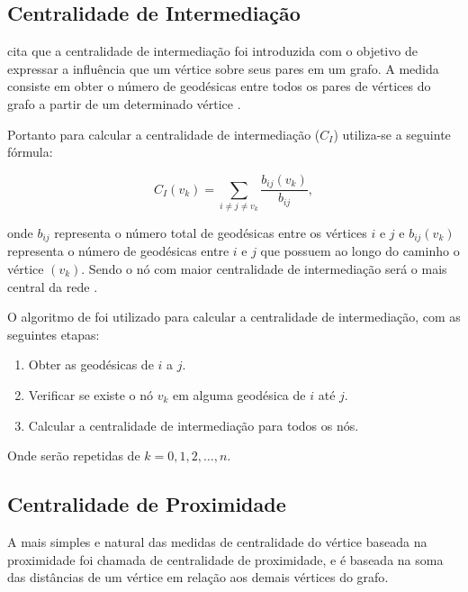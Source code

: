 \documentclass[12pt]{article}
\begin{document}
\subsection{Centralidade de Intermediação}
\cite{freitas} cita que a centralidade de intermediação foi introduzida com o objetivo de expressar a influência que um vértice sobre seus pares em um grafo.
A medida consiste em obter o número de geodésicas entre todos os pares de vértices do grafo a partir de um determinado vértice \cite{freitas}.

Portanto para calcular a centralidade de intermediação ($C_I$) utiliza-se a seguinte fórmula: 
\begin{center}
\begin{equation}
C_I(v_k)=\sum_{i\neq j \neq v_{k}} \frac{b_{ij}(v_k)}{b_{ij}},
\end{equation}
\end{center}
onde $b_{ij}$ representa o número total de geodésicas entre os vértices $i$ e $j$ e  $b_{ij}(v_k)$ representa o número de geodésicas entre $i$ e $j$ que possuem ao longo do caminho o vértice $(v_k)$.
Sendo o nó com maior centralidade de intermediação será o mais central da rede \cite{ufimtsev} \cite{freeman}.

O algoritmo de \cite{Brandes01afaster} foi utilizado para calcular a centralidade de intermediação, com as seguintes etapas:
\begin{enumerate}
\item Obter as geodésicas de $i$ a $j$.
\item Verificar se existe o nó $v_k$ em alguma geodésica de $i$ até $j$.
\item Calcular a centralidade de intermediação para todos os nós.
\end{enumerate}
Onde serão repetidas de $k = 0,1,2,\dots,n$.

\subsection{Centralidade de Proximidade}
A mais simples e natural das medidas de centralidade do vértice baseada na proximidade foi chamada de centralidade de proximidade, e é baseada na soma das distâncias de um  vértice em relação aos demais vértices do grafo\cite{freitas}.
\end{document}
